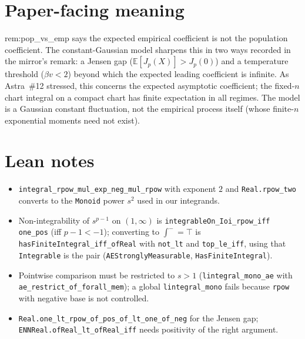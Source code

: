 \documentclass[11pt]{article}
\begin{document}
\section{Paper-facing meaning}
rem:pop\_vs\_emp says the expected empirical coefficient is not the population coefficient. The
constant-Gaussian model sharpens this in two ways recorded in the mirror's remark: a Jensen gap
($\mathbb E[J_p(X)]>J_p(0)$) and a temperature threshold ($\beta v<2$) beyond which the expected
leading coefficient is infinite. As Astra~\#12 stressed, this concerns the expected asymptotic
coefficient; the fixed-$n$ chart integral on a compact chart has finite expectation in all regimes.
The model is a Gaussian constant fluctuation, not the empirical process itself (whose finite-$n$
exponential moments need not exist).

\section{Lean notes}
\begin{itemize}
\item \texttt{integral\_rpow\_mul\_exp\_neg\_mul\_rpow} with exponent $2$ and \texttt{Real.rpow\_two}
converts to the \texttt{Monoid} power $s^2$ used in our integrands.
\item Non-integrability of $s^{p-1}$ on $(1,\infty)$ is \texttt{integrableOn\_Ioi\_rpow\_iff one\_pos}
(iff $p-1<-1$); converting to $\int^-=\top$ is \texttt{hasFiniteIntegral\_iff\_ofReal} with
\texttt{not\_lt} and \texttt{top\_le\_iff}, using that \texttt{Integrable} is the pair
(\texttt{AEStronglyMeasurable}, \texttt{HasFiniteIntegral}).
\item Pointwise comparison must be restricted to $s>1$ (\texttt{lintegral\_mono\_ae} with
\texttt{ae\_restrict\_of\_forall\_mem}); a global \texttt{lintegral\_mono} fails because \texttt{rpow}
with negative base is not controlled.
\item \texttt{Real.one\_lt\_rpow\_of\_pos\_of\_lt\_one\_of\_neg} for the Jensen gap;
\texttt{ENNReal.ofReal\_lt\_ofReal\_iff} needs positivity of the right argument.
\end{itemize}
\end{document}
